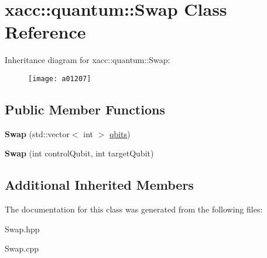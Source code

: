 \hypertarget{a01207}{}\section{xacc\+:\+:quantum\+:\+:Swap Class Reference}
\label{a01207}
Inheritance diagram for xacc\+:\+:quantum\+:\+:Swap\+:\begin{figure}[H]
\begin{center}
\leavevmode
\texttt{[image: a01207]}
\end{center}
\end{figure}
\subsection*{Public Member Functions}
\begin{DoxyCompactItemize}
\item 
\mbox{\label{a01207_a5c35a23a635f235a5615be65e769c121}} 
{\bfseries Swap} (std\+::vector$<$ int $>$ \hyperlink{a01159_a2a56be6c2519ea65df4d06f4abae1393}{qbits})
\item 
\mbox{\label{a01207_ac19efe303b798e14441a2c235b5ba7f3}} 
{\bfseries Swap} (int control\+Qubit, int target\+Qubit)
\end{DoxyCompactItemize}
\subsection*{Additional Inherited Members}


The documentation for this class was generated from the following files\+:\begin{DoxyCompactItemize}
\item 
Swap.\+hpp\item 
Swap.\+cpp\end{DoxyCompactItemize}
